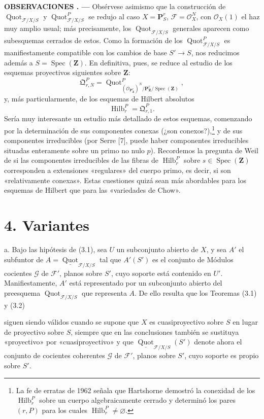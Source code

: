 \documentclass[11pt,twoside,openany]{book}
\numberwithin{equation}{section}
\newcommand{\src}[1]{%
  \phantomsection\hypertarget{src:#1}{}%
  \marginpar{\raggedleft\footnotesize\sffamily #1}%
}
\theoremstyle{plain}
\theoremstyle{definition}
\theoremstyle{remark}
\newcommand{\fsection}[2]{%
  \section*{#1. #2}%
  \addcontentsline{toc}{section}{#1. #2}%
}
\newcommand{\result}[2]{%
  \par\medskip\noindent\textbf{#1%
  \if\relax\detokenize{#2}\relax\else\space#2\fi. ---}\enspace
}
\newcommand{\FgaUnitKey}{frontmatter}
\renewcommand{\src}[1]{%
  \phantomsection\hypertarget{src:\FgaUnitKey:#1}{}%
  \marginpar{\raggedleft\footnotesize\sffamily #1}%
}
\theoremstyle{plain}
\theoremstyle{definition}
\theoremstyle{remark}
\begin{document}
\result{OBSERVACIONES}{3.9} Obsérvese asimismo que la construcción de
$\operatorname{Quot}_{\mathcal F/X/S}$ y
$\operatorname{Quot}^P_{\mathcal F/X/S}$ se redujo al caso
$X=\mathbf P^r_S$, $\mathcal F=\mathcal O_X^N$, con $\mathcal O_X(1)$ el haz
muy amplio usual; más precisamente, los
$\operatorname{Quot}_{\mathcal F/X/S}$ generales aparecen como subesquemas
cerrados de estos. Como la formación de los
$\operatorname{Quot}^P_{\mathcal F/X/S}$ es manifiestamente compatible con
los cambios de base $S'\longrightarrow S$, nos reducimos además a
$S=\operatorname{Spec}(\mathbf Z)$. En definitiva, pues, se reduce al estudio
de los esquemas proyectivos siguientes sobre $\mathbf Z$:
\[
\mathfrak Q^P_{r,N}=
\operatorname{Quot}^{P}_{(\mathcal O_{\mathbf P^r_{\mathbf Z}})^N/
\mathbf P^r_{\mathbf Z}/\operatorname{Spec}(\mathbf Z)},
\]
y, más particularmente, de los esquemas de Hilbert absolutos
\[
\operatorname{Hilb}^P_r=\mathfrak Q^P_{r,1}.
\]
Sería muy interesante un estudio más detallado de estos esquemas, comenzando
por la determinación de sus componentes conexas (¿son conexos?),\footnote{La
fe de erratas de 1962 señala que Hartshorne demostró la conexidad de los
$\operatorname{Hilb}^P_r$ sobre un cuerpo algebraicamente cerrado y determinó
los pares $(r,P)$ para los cuales
$\operatorname{Hilb}^P_r\neq\varnothing$.} y de sus componentes irreducibles
(por Serre [7], puede haber componentes irreducibles situadas enteramente sobre
un primo no nulo $p$). Recordemos la pregunta de Weil de si las componentes
irreducibles de las fibras de $\operatorname{Hilb}^P_r$ sobre
$s\in\operatorname{Spec}(\mathbf Z)$ corresponden a extensiones «regulares»
del cuerpo primo, es decir, si son «relativamente conexas». Estas cuestiones
quizá sean más abordables para los esquemas de Hilbert que para las
«variedades de Chow».

\fsection{4}{Variantes}

\noindent a. Bajo las hipótesis de (3.1), sea $U$ un subconjunto abierto de
$X$, y sea $A'$ el subfuntor de
$A=\underline{\operatorname{Quot}}_{\mathcal F/X/S}$ tal que $A'(S')$ es el
conjunto de Módulos cocientes $\mathcal G$ de $\mathcal F'$, planos sobre
$S'$, cuyo soporte está contenido en $U'$. Manifiestamente, $A'$ está
representado por un subconjunto abierto del preesquema
$\operatorname{Quot}_{\mathcal F/X/S}$ que representa $A$. De ello resulta
que los Teoremas (3.1) y (3.2)
\src{267}
siguen siendo válidos cuando se supone que $X$ es cuasiproyectivo sobre $S$ en
lugar de proyectivo sobre $S$, siempre que en las conclusiones también se
sustituya «proyectivo» por «cuasiproyectivo» y que
$\underline{\operatorname{Quot}}_{\mathcal F/X/S}(S')$ denote ahora el
conjunto de cocientes coherentes $\mathcal G$ de $\mathcal F'$, planos sobre
$S'$, cuyo soporte es propio sobre $S'$.
\end{document}
